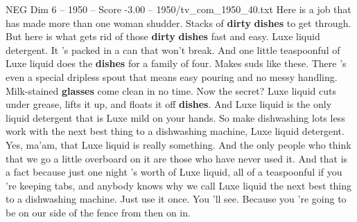 \begin{textsample}{NEG Dim 6 – 1950 – Score -3.00 – 1950/tv\_com\_1950\_40.txt}  \label{ex:f6_neg_089}
Here is a job that has made more than one woman shudder.
Stacks of \textbf{dirty} \textbf{dishes} to get through.
But here is what gets rid of those \textbf{dirty} \textbf{dishes} fast and easy.
Luxe liquid detergent.
It 's packed in a can that won't break.
And one little teaspoonful of Luxe liquid does the \textbf{dishes} for a family of four.
Makes suds like these.
There 's even a special dripless spout that means easy pouring and no messy handling.
Milk-stained \textbf{glasses} come clean in no time.
Now the secret?
Luxe liquid cuts under grease, lifts it up, and floats it off \textbf{dishes}.
And Luxe liquid is the only liquid detergent that is Luxe mild on your hands.
So make dishwashing lots less work with the next best thing to a dishwashing machine, Luxe liquid detergent.
Yes, ma'am, that Luxe liquid is really something.
And the only people who think that we go a little overboard on it are those who have never used it.
And that is a fact because just one night 's worth of Luxe liquid, all of a teaspoonful if you 're keeping tabs, and anybody knows why we call Luxe liquid the next best thing to a dishwashing machine.
Just use it once.
You 'll see.
Because you 're going to be on our side of the fence from then on in.

\end{textsample}
